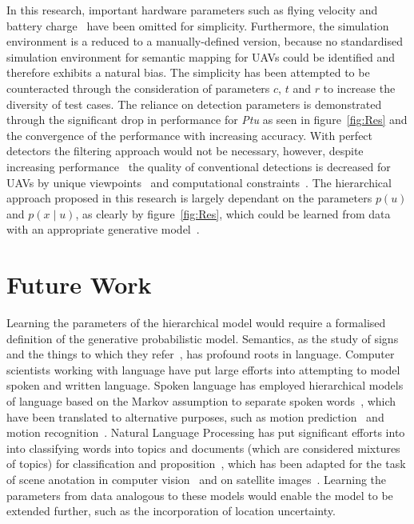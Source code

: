 \documentclass[twocolumn,letterpaper]{IEEEAerospaceCLS}  %
\begin{document}
In this research, important hardware parameters such as flying velocity and battery charge~\cite{boroujerdian_mavbench_2018} have been omitted for simplicity. Furthermore, the simulation environment is a reduced to a manually-defined version, because no standardised simulation environment for semantic mapping for UAVs could be identified and therefore exhibits a natural bias. The simplicity has been attempted to be counteracted through the consideration of parameters $c$, $t$ and $r$ to increase the diversity of test cases.   
The reliance on detection parameters is demonstrated through the significant drop in performance for \emph{Ptu} as seen in figure~\ref{fig:Res} and the convergence of the performance with increasing accuracy. With perfect detectors the filtering approach would not be necessary, however, despite increasing performance~\cite{alom_history_2018} the quality of conventional detections is decreased for UAVs by unique viewpoints~\cite{richardwebster_psyphy:_2019} and computational constraints~\cite{krishnan_sky_2020}. The hierarchical approach proposed in this research is largely dependant on the parameters $p(u)$ and $p(x\mid u)$, as clearly by figure~\ref{fig:Res}, which could be learned from data with an appropriate generative model~\cite{blei_latent_2003,lienou_semantic_2010}.
\section{Future Work} \label{sec:Fut}
Learning the parameters of the hierarchical model would require a formalised definition of the generative probabilistic model. Semantics, as the study of signs and the things to which they refer~\cite{kostavelis_semantic_2015}, has profound roots in language. Computer scientists working with language have put large efforts into attempting to model spoken and written language. Spoken language has employed hierarchical models of language based on the Markov assumption to separate spoken words~\cite{fine_hierarchical_1998,murphy_dynamic_2002}, which have been translated to alternative purposes, such as motion prediction~\cite{li_layered_2015} and motion recognition~\cite{oliver_layered_2002,aarno_layered_2006}. Natural Language Processing has put significant efforts into into classifying words into topics and documents (which are considered mixtures of topics) for classification and proposition~\cite{blei_latent_2003,hofmann_unsupervised_2001}, which has been adapted for the task of scene anotation in computer vision~\cite{bosch_scene_2006,fei-fei_bayesian_2005} and on satellite images~\cite{lienou_semantic_2010}. Learning the parameters from data analogous to these models would enable the model to be extended further, such as the incorporation of location uncertainty.
\end{document}
